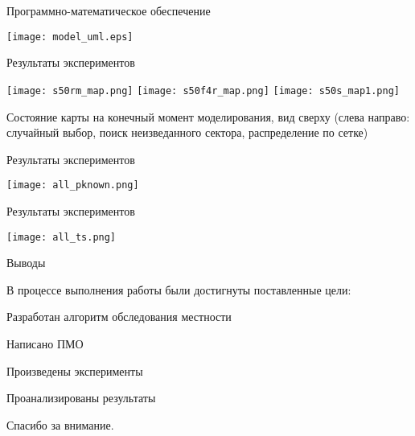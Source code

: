 \begin{tslide}{Программно-математическое обеспечение}

    \centering
    \texttt{[image: model\_uml.eps]}

\end{tslide}

\begin{tslide}{Результаты экспериментов}

    \vfill

    \begin{center}
    \texttt{[image: s50rm\_map.png]}
    \texttt{[image: s50f4r\_map.png]}
    \texttt{[image: s50s\_map1.png]}
    \end{center}
    \vfill

    Состояние карты на конечный момент моделирования, вид сверху
    (слева направо: случайный выбор, поиск неизведанного сектора, 
    распределение по сетке)
    \vfill

\end{tslide}

\begin{tslide}{Результаты экспериментов}

    \centering
    \texttt{[image: all\_pknown.png]}
\end{tslide}

\begin{tslide}{Результаты экспериментов}

    \centering
    \texttt{[image: all\_ts.png]}
\end{tslide}

\begin{tslide}{Выводы}

    В процессе выполнения работы были достигнуты поставленные цели:
    \begin{mintemize}
    \item Разработан алгоритм обследования местности
    \item Написано ПМО
    \item Произведены эксперименты
    \item Проанализированы результаты
    \end{mintemize}

\end{tslide}

\begin{cslide}
    \LARGE Спасибо за внимание.
\end{cslide}


